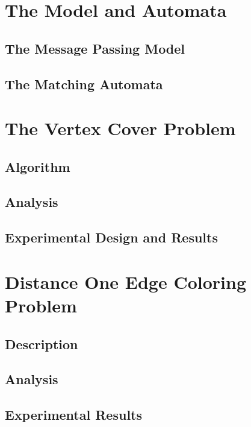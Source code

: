 \documentclass[twoside]{article}
\begin{document}
\section{The Model and Automata}
\label{sec:framework}
\subsection{The Message Passing Model}

\subsection{The Matching Automata}


\section{The Vertex Cover Problem}
\subsection{Algorithm}


\subsection{Analysis}


\subsection{Experimental Design and Results}



\section{Distance One Edge Coloring Problem}
\label{sec:edge-coloring-problems}
\subsection{Description}


\subsection{Analysis}

\subsection{Experimental Results}

\end{document}
